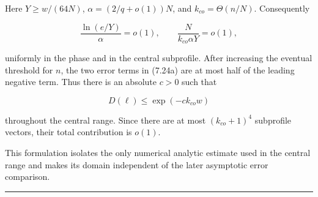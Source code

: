 \documentclass[11pt]{article}
\begin{document}
Here \(Y\ge w/(64N)\), \(\alpha=(2/q+o(1))N\), and \(k_{co}=\Theta(n/N)\). Consequently

\[
 \frac{\ln(e/Y)}{\alpha}=o(1),
 \qquad
 \frac{N}{k_{co}\alpha Y}=o(1),
\]

uniformly in the phase and in the central subprofile. After increasing the eventual threshold for \(n\), the two error terms in (7.24a) are at most half of the leading negative term. Thus there is an absolute \(c>0\) such that

\[
 D(\ell)\le \exp(-c k_{co}w)
 \tag{7.25}
\]

throughout the central range. Since there are at most \((k_{co}+1)^4\) subprofile vectors, their total contribution is \(o(1)\).

This formulation isolates the only numerical analytic estimate used in the central range and makes its domain independent of the later asymptotic error comparison.

\begin{center}\rule{0.5\linewidth}{0.5pt}\end{center}
\end{document}
